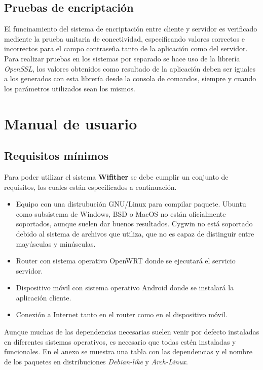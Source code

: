 \documentclass[12pt, twoside]{article}
\begin{document}
    \subsection{Pruebas de encriptación}
    El funcinamiento del sistema de encriptación entre cliente y servidor es verificado mediente la prueba unitaria de conectividad, especificando valores correctos e incorrectos para el campo contraseña tanto de la aplicación como del servidor. Para realizar pruebas en los sistemas por separado se hace uso de la librería \textit{OpenSSL}, los valores obtenidos como resultado de la aplicación deben ser iguales a los generados con esta librería desde la consola de comandos, siempre y cuando los parámetros utilizados sean los mismos. 

\cleardoublepage \section{Manual de usuario} \label{sec:man}
    \subsection{Requisitos mínimos}
        Para poder utilizar el sistema \textbf{Wifither} se debe cumplir un conjunto de requisitos, los cuales están especificados a continuación.

        \begin{itemize}
            \item Equipo con una distrubución GNU/Linux para compilar paquete. Ubuntu como subsistema de Windows, BSD o MacOS no están oficialmente soportados, aunque suelen dar buenos resultados. Cygwin no está soportado debido al sistema de archivos que utiliza, que no es capaz de distinguir entre mayúsculas y minúsculas.
            \item Router con sistema operativo OpenWRT donde se ejecutará el servicio servidor.
            \item Dispositivo móvil con sistema operativo Android donde se instalará la aplicación cliente.
            \item Conexión a Internet tanto en el router como en el dispositivo móvil.
        \end{itemize}

        Aunque muchas de las dependencias necesarias suelen venir por defecto instaladas en diferentes sistemas operativos, es necesario que todas estén instaladas y funcionales. En el anexo  se muestra una tabla con las dependencias y el nombre de los paquetes en distribuciones \textit{Debian-like} y \textit{Arch-Linux}.
\end{document}
